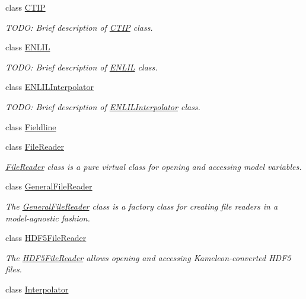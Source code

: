 \begin{DoxyCompactItemize}
class \hyperlink{classccmc_1_1_c_t_i_p}{C\-T\-I\-P}
\begin{DoxyCompactList}\small\item\em T\-O\-D\-O\-: Brief description of \hyperlink{classccmc_1_1_c_t_i_p}{C\-T\-I\-P} class. \end{DoxyCompactList}\item 
class \hyperlink{classccmc_1_1_e_n_l_i_l}{E\-N\-L\-I\-L}
\begin{DoxyCompactList}\small\item\em T\-O\-D\-O\-: Brief description of \hyperlink{classccmc_1_1_e_n_l_i_l}{E\-N\-L\-I\-L} class. \end{DoxyCompactList}\item 
class \hyperlink{classccmc_1_1_e_n_l_i_l_interpolator}{E\-N\-L\-I\-L\-Interpolator}
\begin{DoxyCompactList}\small\item\em T\-O\-D\-O\-: Brief description of \hyperlink{classccmc_1_1_e_n_l_i_l_interpolator}{E\-N\-L\-I\-L\-Interpolator} class. \end{DoxyCompactList}\item 
class \hyperlink{classccmc_1_1_fieldline}{Fieldline}
\item 
class \hyperlink{classccmc_1_1_file_reader}{File\-Reader}
\begin{DoxyCompactList}\small\item\em \hyperlink{classccmc_1_1_file_reader}{File\-Reader} class is a pure virtual class for opening and accessing model variables. \end{DoxyCompactList}\item 
class \hyperlink{classccmc_1_1_general_file_reader}{General\-File\-Reader}
\begin{DoxyCompactList}\small\item\em The \hyperlink{classccmc_1_1_general_file_reader}{General\-File\-Reader} class is a factory class for creating file readers in a model-\/agnostic fashion. \end{DoxyCompactList}\item 
class \hyperlink{classccmc_1_1_h_d_f5_file_reader}{H\-D\-F5\-File\-Reader}
\begin{DoxyCompactList}\small\item\em The \hyperlink{classccmc_1_1_h_d_f5_file_reader}{H\-D\-F5\-File\-Reader} allows opening and accessing Kameleon-\/converted H\-D\-F5 files. \end{DoxyCompactList}\item 
class \hyperlink{classccmc_1_1_interpolator}{Interpolator}

\end{DoxyCompactItemize}
